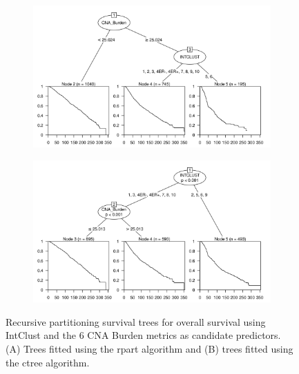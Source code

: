 \begin{figure}[!htb]
\centering

\vspace{0.5cm}

\begin{subfigure}{\textwidth}
\subcaption{}
\includegraphics[width=1\textwidth]{../figures/Appendices/Appendix_B/PartyKit_Survival_Burden_OS_INTCLUST.png}
\end{subfigure}

\vspace{2cm}

\begin{subfigure}{\textwidth}
\subcaption{}
\includegraphics[width=1\textwidth]{../figures/Appendices/Appendix_B/Ctree_Survival_Burden_OS_INTCLUST.png}
\end{subfigure}

\vspace{0.5cm}

\caption[Recursive partitioning survival trees for overall survival using IntClust and the 6 CNA Burden metrics as candidate predictors.]{Recursive partitioning survival trees for overall survival using IntClust and the 6 CNA Burden metrics as candidate predictors. (A) Trees fitted using the rpart algorithm and (B) trees fitted using the ctree algorithm.}
\end{figure}

